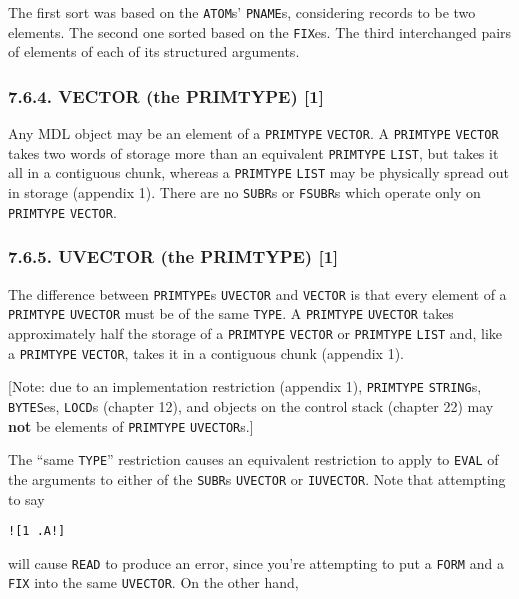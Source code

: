 \documentclass[a4paper,]{article}
\begin{document}
The first sort was based on the \texttt{ATOM}s' \texttt{PNAME}s, considering records to be two elements. The second one
sorted based on the \texttt{FIX}es. The third interchanged pairs of elements of each of its structured arguments.

\subsubsection{7.6.4. VECTOR (the PRIMTYPE) {[}1{]}}\label{vector-the-primtype-1}

Any MDL object may be an element of a \texttt{PRIMTYPE} \texttt{VECTOR}. A \texttt{PRIMTYPE} \texttt{VECTOR} takes two
words of storage more than an equivalent \texttt{PRIMTYPE} \texttt{LIST}, but takes it all in a contiguous chunk, whereas a
\texttt{PRIMTYPE} \texttt{LIST} may be physically spread out in storage (appendix 1). There are no \texttt{SUBR}s or
\texttt{FSUBR}s which operate only on \texttt{PRIMTYPE} \texttt{VECTOR}.

\subsubsection{7.6.5. UVECTOR (the PRIMTYPE) {[}1{]}}\label{uvector-the-primtype-1}

 The difference between \texttt{PRIMTYPE}s \texttt{UVECTOR} and
\texttt{VECTOR} is that every element of a \texttt{PRIMTYPE} \texttt{UVECTOR} must be of the
same \texttt{TYPE}. A \texttt{PRIMTYPE} \texttt{UVECTOR} takes approximately half the storage of a \texttt{PRIMTYPE}
\texttt{VECTOR} or \texttt{PRIMTYPE} \texttt{LIST} and, like a \texttt{PRIMTYPE} \texttt{VECTOR}, takes it in a contiguous
chunk (appendix 1).

{[}Note: due to an implementation restriction (appendix 1), \texttt{PRIMTYPE} \texttt{STRING}s, \texttt{BYTES}es,
\texttt{LOCD}s (chapter 12), and objects on the control stack (chapter 22) may \textbf{not} be elements of
\texttt{PRIMTYPE} \texttt{UVECTOR}s.{]}

The ``same \texttt{TYPE}'' restriction causes an equivalent restriction to apply to \texttt{EVAL} of the arguments to
either of the \texttt{SUBR}s \texttt{UVECTOR} or \texttt{IUVECTOR}. Note that attempting to say

\begin{verbatim}
![1 .A!]
\end{verbatim}

will cause \texttt{READ} to produce an error, since you're attempting to put a \texttt{FORM} and a \texttt{FIX} into the
same \texttt{UVECTOR}. On the other hand,
\end{document}
